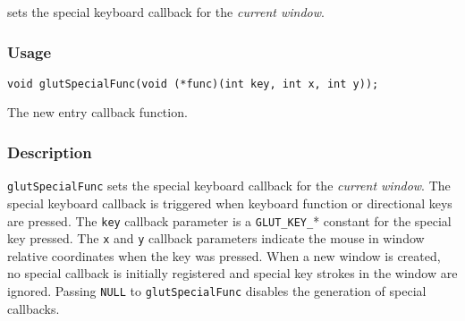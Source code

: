  sets the special keyboard callback for the {\em current window}.

\subsubsection*{Usage}
\begin{verbatim}
void glutSpecialFunc(void (*func)(int key, int x, int y));
\end{verbatim}
\begin{description}
\itemsep 0in
\item[\tt func]
The new entry callback function.
\end{description}

\subsubsection*{Description}

{\tt glutSpecialFunc} sets the special keyboard callback for the {\em current
window}.  The special keyboard callback is triggered when keyboard
function or directional keys are pressed.  The {\tt key} callback parameter
is a {\tt GLUT\_KEY\_}* constant for the special key pressed. 
The {\tt x} and {\tt y} callback parameters indicate the mouse in window
relative coordinates when the key was pressed.  When a new window is created, no
special callback is initially registered and special key strokes in the
window are ignored.  Passing {\tt NULL} to {\tt glutSpecialFunc}
disables the generation of special callbacks.

